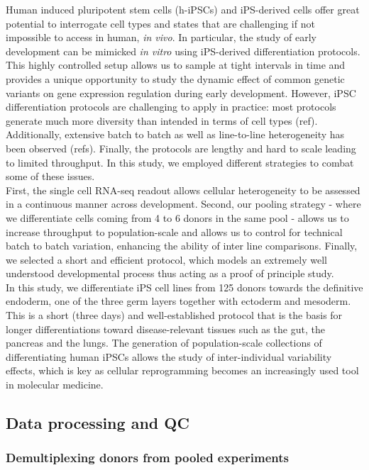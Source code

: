 Human induced pluripotent stem cells (h-iPSCs) and iPS-derived cells offer great potential to interrogate cell types and states that are challenging if not impossible to access in human, \textit{in vivo}.
In particular, the study of early development can be mimicked \textit{in vitro} using iPS-derived differentiation protocols. 
This highly controlled setup allows us to sample at tight intervals in time and provides a unique opportunity to study the dynamic effect of common genetic variants on gene expression regulation during early development.
However, iPSC differentiation protocols are challenging to apply in practice: most protocols generate much more diversity than intended in terms of cell types (ref). 
Additionally, extensive batch to batch as well as line-to-line heterogeneity has been observed (refs). Finally, the protocols are lengthy and hard to scale leading to limited throughput. 
In this study, we employed different strategies to combat some of these issues.\\ 

First, the single cell RNA-seq readout allows cellular heterogeneity to be assessed in a continuous manner across development.
Second, our pooling strategy - where we differentiate cells coming from 4 to 6 donors in the same pool - allows us to increase throughput to population-scale and allows us to control for technical batch to batch variation, enhancing the ability of inter line comparisons.
Finally, we selected a short and efficient protocol, which models an extremely well understood developmental process thus acting as a proof of principle study.\\

In this study, we differentiate iPS cell lines from 125 donors towards the definitive endoderm, one of the three germ layers together with ectoderm and mesoderm. 
This is a short (three days) and well-established protocol that is the basis for longer differentiations toward disease-relevant tissues such as the gut, the pancreas and the lungs.
The generation of population-scale collections of differentiating human iPSCs allows the study of inter-individual variability effects, which is key as cellular reprogramming becomes an increasingly used tool in molecular medicine.

\subsection{Data processing and QC}

\subsubsection{Demultiplexing donors from pooled experiments} 

